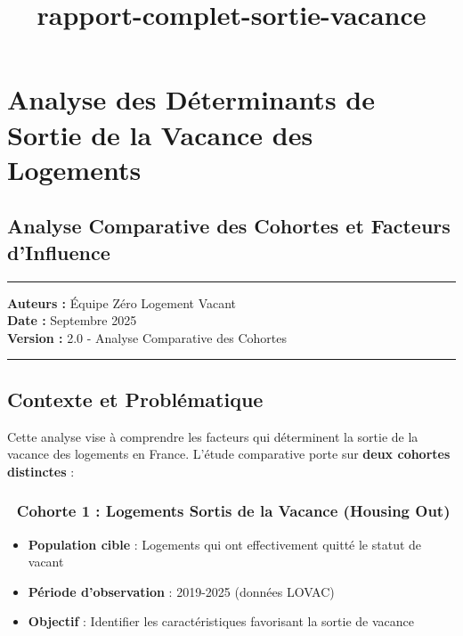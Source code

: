 \documentclass[11pt]{article}
\title{rapport-complet-sortie-vacance}
\providecommand{\tightlist}{%
      \setlength{\itemsep}{0pt}\setlength{\parskip}{0pt}}
\begin{document}
    
    \maketitle
    
    

    
    \section{Analyse des Déterminants de Sortie de la Vacance des
Logements}\label{analyse-des-duxe9terminants-de-sortie-de-la-vacance-des-logements}

\subsection{Analyse Comparative des Cohortes et Facteurs
d'Influence}\label{analyse-comparative-des-cohortes-et-facteurs-dinfluence}

\begin{center}\rule{0.5\linewidth}{0.5pt}\end{center}

\textbf{Auteurs :} Équipe Zéro Logement Vacant\\
\textbf{Date :} Septembre 2025\\
\textbf{Version :} 2.0 - Analyse Comparative des Cohortes

\begin{center}\rule{0.5\linewidth}{0.5pt}\end{center}

\subsection{Contexte et
Problématique}\label{contexte-et-probluxe9matique}

Cette analyse vise à comprendre les facteurs qui déterminent la sortie
de la vacance des logements en France. L'étude comparative porte sur
\textbf{deux cohortes distinctes} :

\subsubsection{\texorpdfstring{🎯 \textbf{Cohorte 1 : Logements Sortis
de la Vacance (Housing
Out)}}{🎯 Cohorte 1 : Logements Sortis de la Vacance (Housing Out)}}\label{cohorte-1-logements-sortis-de-la-vacance-housing-out}

\begin{itemize}
\tightlist
\item
  \textbf{Population cible} : Logements qui ont effectivement quitté le
  statut de vacant
\item
  \textbf{Période d'observation} : 2019-2025 (données LOVAC)
\item
  \textbf{Objectif} : Identifier les caractéristiques favorisant la
  sortie de vacance
\end{itemize}
\end{document}
